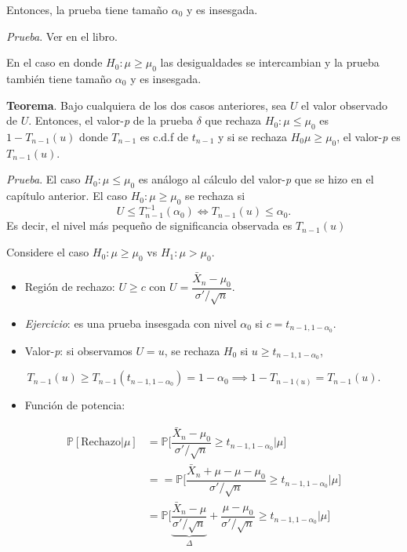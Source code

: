 \documentclass[
  12pt,
]{book}
\providecommand{\tightlist}{%
  \setlength{\itemsep}{0pt}\setlength{\parskip}{0pt}}
\begin{document}
Entonces, la prueba tiene tamaño \(\alpha_0\) y es insesgada.

\emph{Prueba}. Ver en el libro.

En el caso en donde \(H_0:\mu\geq \mu_0\) las desigualdades se intercambian y la prueba también tiene tamaño \(\alpha_0\) y es insesgada.

\textbf{Teorema}. Bajo cualquiera de los dos casos anteriores, sea \(U\) el valor observado de \(U\). Entonces, el valor-\emph{p} de la prueba \(\delta\) que rechaza \(H_0: \mu\leq\mu_0\) es \(1-T_{n-1}(u)\) donde \(T_{n-1}\) es c.d.f de \(t_{n-1}\) y si se rechaza \(H_0 \mu\geq \mu_0\), el valor-\emph{p} es \(T_{n-1}(u)\).

\emph{Prueba}. El caso \(H_0:\mu\leq\mu_0\) es análogo al cálculo del valor-\emph{p} que se hizo en el capítulo anterior. El caso \(H_0: \mu\geq \mu_0\) se rechaza si \[U\leq T_{n-1}^{-1}(\alpha_0) \Leftrightarrow T_{n-1}(u)\leq \alpha_0.\]
Es decir, el nivel más pequeño de significancia observada es \(T_{n-1}(u)\)

Considere el caso \(H_0: \mu\geq \mu_0\) vs \(H_1: \mu>\mu_0\).

\begin{itemize}
\item
  Región de rechazo: \(U\geq c\) con \(U= \dfrac{\bar X_n -\mu_0}{\sigma' /\sqrt n}\).
\item
  \emph{Ejercicio}: es una prueba insesgada con nivel \(\alpha_0\) si \(c = t_{n-1,1-\alpha_0}\).
\item
  Valor-\emph{p}: si observamos \(U=u\), se rechaza \(H_0\) si \(u\geq t_{n-1,1-\alpha_0}\),
\end{itemize}

\[T_{n-1}(u) \geq T_{n-1}(t_{n-1,1-\alpha_0}) = 1-\alpha_0 \implies 1-T_{n-1(u)} = T_{n-1}(u).\]

\begin{itemize}
\tightlist
\item
  Función de potencia:
\end{itemize}

\begin{align*}
\mathbb P[\text{Rechazo}|\mu] & = \mathbb P\bigg[ \dfrac{\bar X_n -\mu_0}{\sigma' /\sqrt n}\geq t_{n-1,1-\alpha_0}\bigg| \mu \bigg]\\
&= = \mathbb P\bigg[ \dfrac{\bar X_n +\mu-\mu-\mu_0}{\sigma' /\sqrt n}\geq t_{n-1,1-\alpha_0}\bigg| \mu \bigg]\\
& = \mathbb P\bigg[ \underbrace{\dfrac{\bar X_n -\mu}{\sigma' /\sqrt n}}_{\Delta}+ \dfrac{\mu-\mu_0}{\sigma' /\sqrt n}\geq t_{n-1,1-\alpha_0}\bigg| \mu \bigg]\\
\end{align*}
\end{document}
